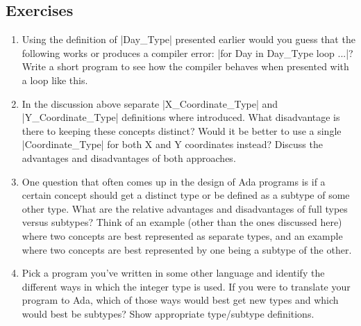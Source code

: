 \subsection*{Exercises}

\begin{enumerate}
\item Using the definition of |Day_Type| presented earlier would you guess that the following
  works or produces a compiler error: |for Day in Day_Type loop ...|? Write a short program to
  see how the compiler behaves when presented with a loop like this.

\item In the discussion above separate |X_Coordinate_Type| and |Y_Coordinate_Type| definitions
  where introduced. What disadvantage is there to keeping these concepts distinct? Would it be
  better to use a single |Coordinate_Type| for both X and Y coordinates instead? Discuss the
  advantages and disadvantages of both approaches.

\item One question that often comes up in the design of Ada programs is if a certain concept
  should get a distinct type or be defined as a subtype of some other type. What are the
  relative advantages and disadvantages of full types versus subtypes? Think of an example
  (other than the ones discussed here) where two concepts are best represented as separate
  types, and an example where two concepts are best represented by one being a subtype of the
  other.

\item Pick a program you've written in some other language and identify the different ways in
  which the integer type is used. If you were to translate your program to Ada, which of those
  ways would best get new types and which would best be subtypes? Show appropriate type/subtype
  definitions.
\end{enumerate}


